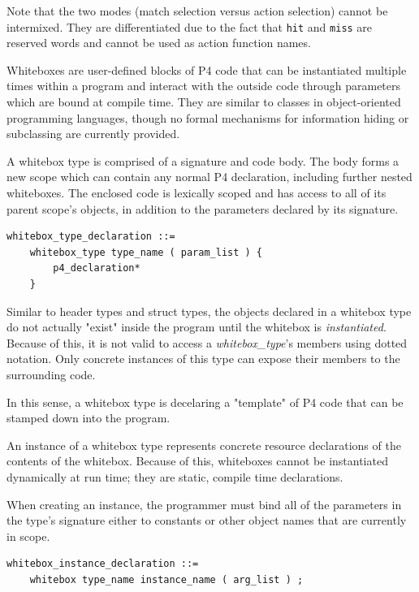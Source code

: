 \documentclass[12pt]{article}
\begin{document}
Note that the two modes (match selection versus action selection) cannot be
intermixed. They are differentiated due to the fact that \texttt{hit} and
\texttt{miss} are reserved words and cannot be used as action function names.


Whiteboxes are user-defined blocks of P4 code that can be instantiated multiple
times within a program and interact with the outside code through parameters
which are bound at compile time. They are similar to classes in object-oriented
programming languages, though no formal mechanisms for information hiding or 
subclassing are currently provided.


A whitebox type is comprised of a signature and code body. The body forms a new
scope which can contain any normal P4 declaration, including further nested
whiteboxes. The enclosed code is lexically scoped and has access to all of its
parent scope's objects, in addition to the parameters declared by its signature.

\begin{lstlisting}[style=BNFstyle]
whitebox_type_declaration ::= 
    whitebox_type type_name ( param_list ) { 
        p4_declaration*
    }
\end{lstlisting}

Similar to header types and struct types, the objects declared in a whitebox
type do not actually "exist" inside the program until the whitebox is
\textit{instantiated}. Because of this, it is not valid to access a
\textit{whitebox_type}'s members using dotted notation. Only concrete instances
of this type can expose their members to the surrounding code.

In this sense, a whitebox type is decelaring a "template" of P4 code that can 
be stamped down into the program.


An instance of a whitebox type represents concrete resource declarations of the
contents of the whitebox. Because of this, whiteboxes cannot be instantiated
dynamically at run time; they are static, compile time declarations.

When creating an instance, the programmer must bind all of the parameters in
the type's signature either to constants or other object names that are
currently in scope. 

\begin{lstlisting}[style=BNFstyle]
whitebox_instance_declaration ::= 
    whitebox type_name instance_name ( arg_list ) ;
\end{lstlisting}
\end{document}
